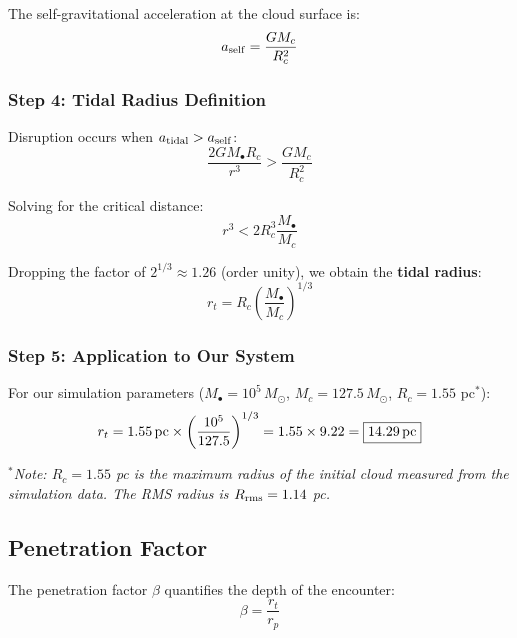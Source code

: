 \documentclass[twocolumn,amsmath,amssymb,prd,superscriptaddress,nofootinbib]{revtex4-2}
\begin{document}
The self-gravitational acceleration at the cloud surface is:
\begin{equation}
    a_{\rm self} = \frac{GM_c}{R_c^2}
    \label{eq:a_self}
\end{equation}

\subsubsection{Step 4: Tidal Radius Definition}

Disruption occurs when $a_{\rm tidal} > a_{\rm self}$:
\begin{equation}
    \frac{2GM_\bullet R_c}{r^3} > \frac{GM_c}{R_c^2}
\end{equation}

Solving for the critical distance:
\begin{equation}
    r^3 < 2R_c^3\frac{M_\bullet}{M_c}
\end{equation}

Dropping the factor of $2^{1/3} \approx 1.26$ (order unity), we obtain the \textbf{tidal radius}:
\begin{equation}
    \boxed{r_t = R_c\left(\frac{M_\bullet}{M_c}\right)^{1/3}}
    \label{eq:r_tidal}
\end{equation}

\subsubsection{Step 5: Application to Our System}

For our simulation parameters ($M_\bullet = 10^5\,M_\odot$, $M_c = 127.5\,M_\odot$, $R_c = 1.55$ pc$^*$):
\begin{equation}
    r_t = 1.55\,{\rm pc} \times \left(\frac{10^5}{127.5}\right)^{1/3} = 1.55 \times 9.22 = \boxed{14.29\,{\rm pc}}
\end{equation}

\noindent $^*$\textit{Note: $R_c = 1.55$ pc is the maximum radius of the initial cloud measured from the simulation data. The RMS radius is $R_{\rm rms} = 1.14$ pc.}

\subsection{Penetration Factor}
\label{sec:beta}

The penetration factor $\beta$ quantifies the depth of the encounter:
\begin{equation}
    \boxed{\beta = \frac{r_t}{r_p}}
    \label{eq:beta}
\end{equation}
\end{document}
